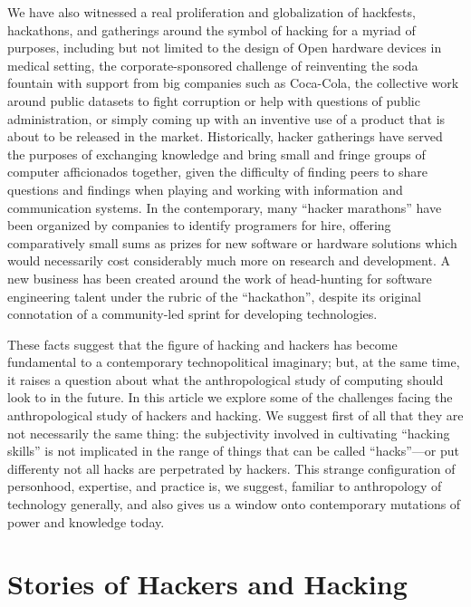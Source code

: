 \documentclass[10pt,letter,oneside]{scrartcl}
\begin{document}
We have also witnessed a real proliferation and globalization of hackfests,
hackathons, and gatherings around the symbol of hacking for a myriad of
purposes, including but not limited to the design of Open hardware devices in
medical setting, the corporate-sponsored challenge of reinventing the soda
fountain with support from big companies such as Coca-Cola, the collective work
around public datasets to fight corruption or help with questions of public
administration, or simply coming up with an inventive use of a product that is
about to be released in the market.  Historically, hacker gatherings have
served the purposes of exchanging knowledge and bring small and fringe groups
of computer afficionados together, given the difficulty of finding peers to
share questions and findings when playing and working with information and
communication systems.  In the contemporary, many ``hacker marathons'' have
been organized by companies to identify programers for hire, offering
comparatively small sums as prizes for new software or hardware solutions which
would necessarily cost considerably much more on research and development.  A
new business has been created around the work of head-hunting for software
engineering talent under the rubric of the ``hackathon'', despite its original
connotation of a community-led sprint for developing technologies.

These facts suggest that the figure of hacking and hackers has become
fundamental to a contemporary technopolitical imaginary; but, at the same time,
it raises a question about what the anthropological study of computing should
look to in the future.  In this article we explore some of the challenges
facing the anthropological study of hackers and hacking.  We suggest first of
all that they are not necessarily the same thing:  the subjectivity involved in
cultivating ``hacking skills'' is not implicated in the range of things that
can be called ``hacks''---or put differenty not all hacks are perpetrated by
hackers.  This strange configuration of personhood, expertise, and practice is,
we suggest, familiar to  anthropology of technology generally, and also gives
us a window onto contemporary mutations of power and knowledge today.

\section*{Stories of Hackers and Hacking}
\end{document}
